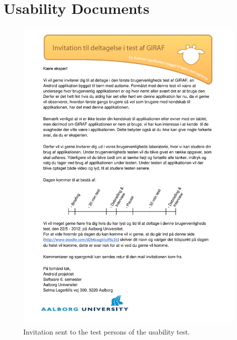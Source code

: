 \chapter{Usability Documents}
\label{app:usability_documents}
\begin{figure}[H]
	\begin{center}
	\includegraphics[width=\textwidth]{Appendix/invitation_to_usability_test.pdf}
	\end{center}
\caption{Invitation sent to the test persons of the usability test.}
\label{fig:usability_test_invitation}
\end{figure}







